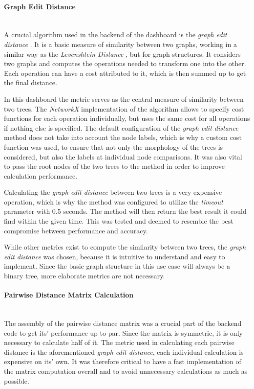 \documentclass[a4paper, 12pt]{article}
\begin{document}
\paragraph{Graph Edit Distance}\mbox{}\\
A crucial algorithm used in the backend of the dashboard is the \textit{graph edit distance}
\cite{sanfeliu1983distance}. It is a basic measure of similarity between two graphs, working in
a similar way as the \textit{Levenshtein Distance} \cite{levenshtein1966binary}, but for graph
structures. It considers two graphs and computes the operations needed to transform one into the
other. Each operation can have a cost attributed to it, which is then summed up to get the final
distance. \par

In this dashboard the metric serves as the central measure of similarity between two trees. The
\textit{NetworkX} implementation of the algorithm allows to specify cost functions for each
operation individually, but uses the same cost for all operations if nothing else is specified.
The default configuration of the \textit{graph edit distance} method does not take into account
the node labels, which is why a custom cost function was used, to ensure that not only the
morphology of the trees is considered, but also the labels at individual node comparisons.
It was also vital to pass the root nodes of the two trees to the method in order to improve
calculation performance. \par

Calculating the \textit{graph edit distance} between two trees is a very expensive operation,
which is why the method was configured to utilize the \textit{timeout} parameter with 0.5 seconds.
The method will then return the best result it could find within the given time. This was tested
and deemed to resemble the best compromise between performance and accuracy.

While other metrics exist to compute the similarity between two trees, the \textit{graph edit
    distance} was chosen, because it is intuitive to understand and easy to implement. Since the
basic graph structure in this use case will always be a binary tree, more elaborate metrics
are not necessary.

\paragraph{Pairwise Distance Matrix Calculation}\mbox{}\\
The assembly of the pairwise distance matrix was a crucial part of the backend code to get its'
performance up to par. Since the matrix is symmetric, it is only necessary to calculate half of
it. The metric used in calculating each pairwise distance is the aforementioned \textit{graph
    edit distance}, each individual calculation is expensive on its' own. It was therefore critical
to have a fast implementation of the matrix computation overall and to avoid unnecessary
calculations as much as possible. \par
\end{document}
